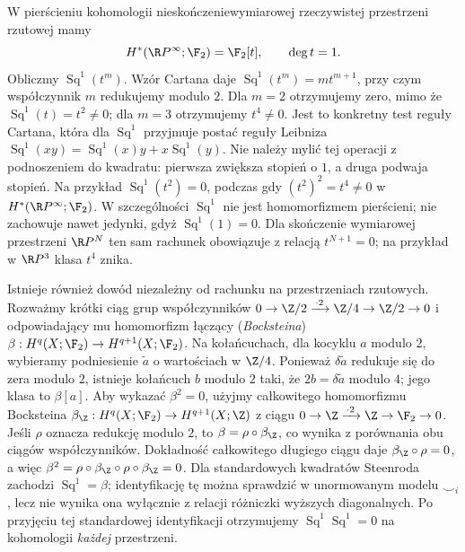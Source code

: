 \begin{przyklad}
W pierścieniu kohomologii nieskończeniewymiarowej
rzeczywistej przestrzeni rzutowej mamy
\[H^*(\R P^\infty;\F_2)=\F_2[t],\qquad\deg t=1.\]
Obliczmy $\operatorname{Sq}^1(t^m)$.
Wzór Cartana daje
$\operatorname{Sq}^1(t^m)=m t^{m+1}$, przy czym
współczynnik $m$ redukujemy modulo $2$.
Dla $m=2$ otrzymujemy zero, mimo że
$\operatorname{Sq}^1(t)=t^2\ne0$; dla $m=3$
otrzymujemy $t^4\ne0$. Jest to konkretny test reguły Cartana, która dla
$\operatorname{Sq}^1$ przyjmuje postać reguły Leibniza
$\operatorname{Sq}^1(xy)=\operatorname{Sq}^1(x)y+
x\operatorname{Sq}^1(y)$. Nie należy mylić tej operacji
z podnoszeniem do kwadratu: pierwsza zwiększa stopień
o $1$, a druga podwaja stopień. Na przykład
$\operatorname{Sq}^1(t^2)=0$, podczas gdy
$(t^2)^2=t^4\ne0$ w $H^*(\R P^\infty;\F_2)$.
W szczególności $\operatorname{Sq}^1$ nie jest
homomorfizmem pierścieni; nie zachowuje nawet jedynki,
gdyż $\operatorname{Sq}^1(1)=0$.
Dla skończenie wymiarowej przestrzeni $\R P^N$
ten sam rachunek obowiązuje z relacją $t^{N+1}=0$;
na przykład w $\R P^3$ klasa $t^4$ znika.
\end{przyklad}

\begin{uwaga}[Uniwersalne uzasadnienie relacji $\operatorname{Sq}^1\operatorname{Sq}^1=0$]
Istnieje również dowód niezależny od rachunku na przestrzeniach
rzutowych. Rozważmy krótki ciąg grup współczynników
$0\to\Z/2\xrightarrow{\,\cdot2\,}\Z/4
\to\Z/2\to0$ i odpowiadający mu homomorfizm
łączący (\emph{Bocksteina})
$\beta:H^q(X;\F_2)\to H^{q+1}(X;\F_2)$.
Na kołańcuchach, dla kocyklu $a$ modulo $2$, wybieramy
podniesienie $\widetilde a$ o wartościach w $\Z/4$.
Ponieważ $\delta\widetilde a$ redukuje się do zera
modulo $2$, istnieje kołańcuch $b$ modulo $2$ taki, że
$2b=\delta\widetilde a$ modulo $4$; jego klasa to
$\beta[a]$. Aby wykazać $\beta^2=0$, użyjmy całkowitego
homomorfizmu Bocksteina $\beta_{\Z}:H^q(X;\F_2)
\to H^{q+1}(X;\Z)$ z ciągu
$0\to\Z\xrightarrow{\,\cdot2\,}\Z\to\F_2\to0$.
Jeśli $\rho$ oznacza redukcję modulo $2$, to
$\beta=\rho\circ\beta_{\Z}$, co wynika z
porównania obu ciągów współczynników. Dokładność
całkowitego długiego ciągu daje
$\beta_{\Z}\circ\rho=0$, a więc
$\beta^2=\rho\circ\beta_{\Z}\circ\rho\circ\beta_{\Z}=0$.
Dla standardowych kwadratów Steenroda zachodzi
$\operatorname{Sq}^1=\beta$; identyfikację tę można
sprawdzić w unormowanym modelu $\smile_i$, lecz
nie wynika ona wyłącznie z relacji różniczki
wyższych diagonalnych. Po przyjęciu tej standardowej
identyfikacji otrzymujemy $\operatorname{Sq}^1\operatorname{Sq}^1=0$
na kohomologii \emph{każdej} przestrzeni.
\end{uwaga}

